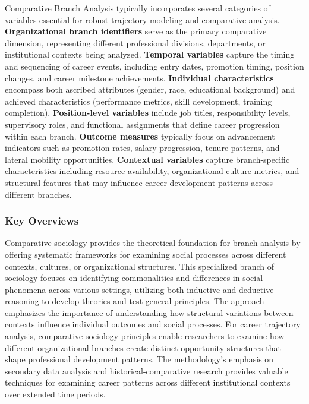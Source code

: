 \documentclass[main.tex]{subfiles}
\begin{document}
Comparative Branch Analysis typically incorporates several categories of variables essential for robust trajectory modeling and comparative analysis. \textbf{Organizational branch identifiers} serve as the primary comparative dimension, representing different professional divisions, departments, or institutional contexts being analyzed. \textbf{Temporal variables} capture the timing and sequencing of career events, including entry dates, promotion timing, position changes, and career milestone achievements\parencite{ECB2021, PoliticalMethodology2018}. \textbf{Individual characteristics} encompass both ascribed attributes (gender, race, educational background) and achieved characteristics (performance metrics, skill development, training completion)\parencite{Senger2020, Cheng2022}. \textbf{Position-level variables} include job titles, responsibility levels, supervisory roles, and functional assignments that define career progression within each branch\parencite{Senger2019, Senger2025}. \textbf{Outcome measures} typically focus on advancement indicators such as promotion rates, salary progression, tenure patterns, and lateral mobility opportunities\parencite{Cheng2022}. \textbf{Contextual variables} capture branch-specific characteristics including resource availability, organizational culture metrics, and structural features that may influence career development patterns across different branches.

\subsubsection{Key Overviews}


Comparative sociology provides the theoretical foundation for branch analysis by offering systematic frameworks for examining social processes across different contexts, cultures, or organizational structures\parencite{Wienclaw2021}. This specialized branch of sociology focuses on identifying commonalities and differences in social phenomena across various settings, utilizing both inductive and deductive reasoning to develop theories and test general principles. The approach emphasizes the importance of understanding how structural variations between contexts influence individual outcomes and social processes. For career trajectory analysis, comparative sociology principles enable researchers to examine how different organizational branches create distinct opportunity structures that shape professional development patterns. The methodology's emphasis on secondary data analysis and historical-comparative research provides valuable techniques for examining career patterns across different institutional contexts over extended time periods.
\end{document}
